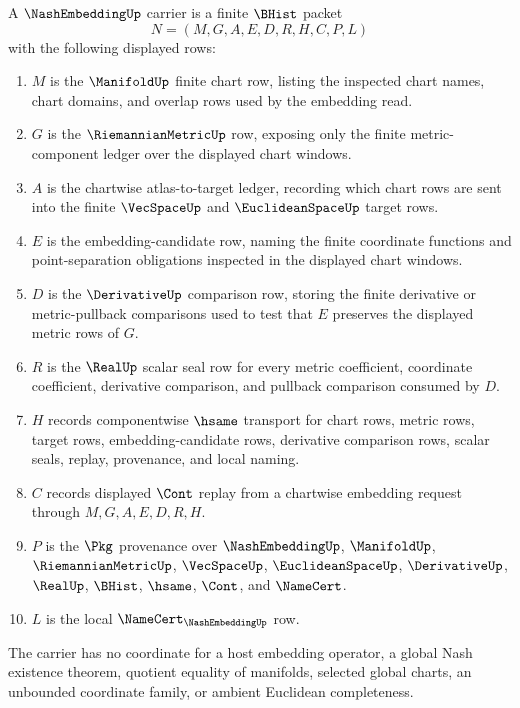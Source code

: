 \begin{definition}
\label{def:nash-embedding-carrier}
A $\NashEmbeddingUp$ carrier is a finite $\BHist$ packet
$$
N=(M,G,A,E,D,R,H,C,P,L)
$$
with the following displayed rows:
\begin{enumerate}
\item $M$ is the $\ManifoldUp$ finite chart row, listing the inspected chart names, chart domains, and overlap rows used by the embedding read.
\item $G$ is the $\RiemannianMetricUp$ row, exposing only the finite metric-component ledger over the displayed chart windows.
\item $A$ is the chartwise atlas-to-target ledger, recording which chart rows are sent into the finite $\VecSpaceUp$ and $\EuclideanSpaceUp$ target rows.
\item $E$ is the embedding-candidate row, naming the finite coordinate functions and point-separation obligations inspected in the displayed chart windows.
\item $D$ is the $\DerivativeUp$ comparison row, storing the finite derivative or metric-pullback comparisons used to test that $E$ preserves the displayed metric rows of $G$.
\item $R$ is the $\RealUp$ scalar seal row for every metric coefficient, coordinate coefficient, derivative comparison, and pullback comparison consumed by $D$.
\item $H$ records componentwise $\hsame$ transport for chart rows, metric rows, target rows, embedding-candidate rows, derivative comparison rows, scalar seals, replay, provenance, and local naming.
\item $C$ records displayed $\Cont$ replay from a chartwise embedding request through $M,G,A,E,D,R,H$.
\item $P$ is the $\Pkg$ provenance over $\NashEmbeddingUp$, $\ManifoldUp$, $\RiemannianMetricUp$, $\VecSpaceUp$, $\EuclideanSpaceUp$, $\DerivativeUp$, $\RealUp$, $\BHist$, $\hsame$, $\Cont$, and $\NameCert$.
\item $L$ is the local $\NameCert_{\NashEmbeddingUp}$ row.
\end{enumerate}
The carrier has no coordinate for a host embedding operator, a global Nash existence theorem, quotient equality of manifolds, selected global charts, an unbounded coordinate family, or ambient Euclidean completeness.
\end{definition}

